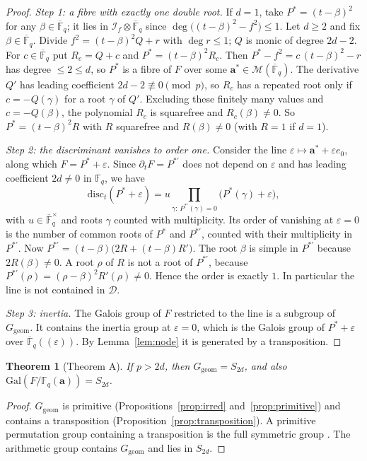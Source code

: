 \documentclass[11pt,a4paper]{article}
\newtheorem{theorem}{Theorem}[section]
\theoremstyle{definition}
\theoremstyle{remark}
\newcommand{\Fq}{\mathbb{F}_q}
\newcommand{\Fqbar}{\overline{\mathbb{F}}_q}
\newcommand{\Gal}{\mathrm{Gal}}
\newcommand{\disc}{\mathrm{disc}}
\newcommand{\Ggeom}{G_{\mathrm{geom}}}
\newcommand{\cI}{\mathcal{I}}
\newcommand{\cM}{\mathcal{M}}
\newcommand{\ba}{\mathbf{a}}
\begin{document}
\begin{proof}
\emph{Step 1: a fibre with exactly one double root.}
If $d=1$, take $P^\ast=(t-\beta)^2$ for any $\beta\in\Fqbar$; it lies in
$\cI_f\otimes\Fqbar$ since $\deg\bigl((t-\beta)^2-f^2\bigr)\le1$.
Let $d\ge2$ and fix $\beta\in\Fqbar$. Divide $f^2=(t-\beta)^2Q+r$ with $\deg r\le1$;
$Q$ is monic of degree $2d-2$. For $c\in\Fqbar$ put
$R_c=Q+c$ and $P^\ast=(t-\beta)^2R_c$. Then
$P^\ast-f^2=c\,(t-\beta)^2-r$ has degree $\le2\le d$, so $P^\ast$ is a fibre of $F$
over some $\ba^\ast\in\cM(\Fqbar)$. The derivative $Q'$ has leading coefficient
$2d-2\not\equiv0\pmod p$, so $R_c$ has a repeated root only if $c=-Q(\gamma)$ for a
root $\gamma$ of $Q'$. Excluding these finitely many values and $c=-Q(\beta)$,
the polynomial $R_c$ is squarefree and $R_c(\beta)\ne0$.
So $P^\ast=(t-\beta)^2R$ with $R$ squarefree and $R(\beta)\neq0$ (with $R=1$ if $d=1$).

\emph{Step 2: the discriminant vanishes to order one.}
Consider the line $\varepsilon\mapsto\ba^\ast+\varepsilon e_0$, along which
$F=P^\ast+\varepsilon$. Since $\partial_tF=P^{\ast\prime}$ does not depend on $\varepsilon$
and has leading coefficient $2d\ne0$ in $\Fq$, we have
\[
 \disc_t(P^\ast+\varepsilon)=u\prod_{\gamma:\,P^{\ast\prime}(\gamma)=0}\bigl(P^\ast(\gamma)+\varepsilon\bigr),
\]
with $u\in\Fqbar^\times$ and roots $\gamma$ counted with multiplicity. Its order of vanishing at
$\varepsilon=0$ is the number of common roots of $P^\ast$ and $P^{\ast\prime}$, counted
with their multiplicity in $P^{\ast\prime}$. Now
$P^{\ast\prime}=(t-\beta)\bigl(2R+(t-\beta)R'\bigr)$. The root $\beta$ is simple in
$P^{\ast\prime}$ because $2R(\beta)\ne0$. A root $\rho$ of $R$ is not a root of
$P^{\ast\prime}$, because $P^{\ast\prime}(\rho)=(\rho-\beta)^2R'(\rho)\ne0$.
Hence the order is exactly $1$. In particular the line is not contained in $\mathcal D$.

\emph{Step 3: inertia.}
The Galois group of $F$ restricted to the line is a subgroup of $\Ggeom$.
It contains the inertia group at $\varepsilon=0$, which is the Galois group of
$P^\ast+\varepsilon$ over $\Fqbar((\varepsilon))$. By Lemma~\ref{lem:node} it is
generated by a transposition.
\end{proof}

\begin{theorem}[Theorem A]\label{thm:monodromy}
If $p>2d$, then $\Ggeom=S_{2d}$, and also $\Gal(F/\Fq(\ba))=S_{2d}$.
\end{theorem}

\begin{proof}
$\Ggeom$ is primitive (Propositions~\ref{prop:irred} and~\ref{prop:primitive}) and
contains a transposition (Proposition~\ref{prop:transposition}). A primitive permutation
group containing a transposition is the full symmetric group
\cite[Thm.~3.3A]{DM1996}. The arithmetic group contains $\Ggeom$ and lies in $S_{2d}$.
\end{proof}
\end{document}
